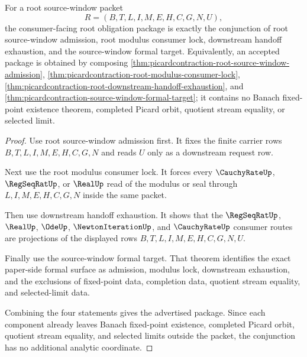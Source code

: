 \begin{theorem}
\label{thm:picard-contraction-root-window-obligation-package}
For a root source-window packet
$$
R=(B,T,L,I,M,E,H,C,G,N,U),
$$
the consumer-facing root obligation package is exactly the conjunction of root source-window admission, root modulus consumer lock, downstream handoff exhaustion, and the source-window formal target. Equivalently, an accepted package is obtained by composing \autoref{thm:picardcontraction-root-source-window-admission}, \autoref{thm:picardcontraction-root-modulus-consumer-lock}, \autoref{thm:picardcontraction-root-downstream-handoff-exhaustion}, and \autoref{thm:picardcontraction-source-window-formal-target}; it contains no Banach fixed-point existence theorem, completed Picard orbit, quotient stream equality, or selected limit.
\end{theorem}
\begin{proof}
Use root source-window admission first. It fixes the finite carrier rows $B,T,L,I,M,E,H,C,G,N$ and reads $U$ only as a downstream request row.

Next use the root modulus consumer lock. It forces every $\CauchyRateUp$, $\RegSeqRatUp$, or $\RealUp$ read of the modulus or seal through $L,I,M,E,H,C,G,N$ inside the same packet.

Then use downstream handoff exhaustion. It shows that the $\RegSeqRatUp$, $\RealUp$, $\OdeUp$, $\NewtonIterationUp$, and $\CauchyRateUp$ consumer routes are projections of the displayed rows $B,T,L,I,M,E,H,C,G,N,U$.

Finally use the source-window formal target. That theorem identifies the exact paper-side formal surface as admission, modulus lock, downstream exhaustion, and the exclusions of fixed-point data, completion data, quotient stream equality, and selected-limit data.

Combining the four statements gives the advertised package. Since each component already leaves Banach fixed-point existence, completed Picard orbit, quotient stream equality, and selected limits outside the packet, the conjunction has no additional analytic coordinate.
\end{proof}

